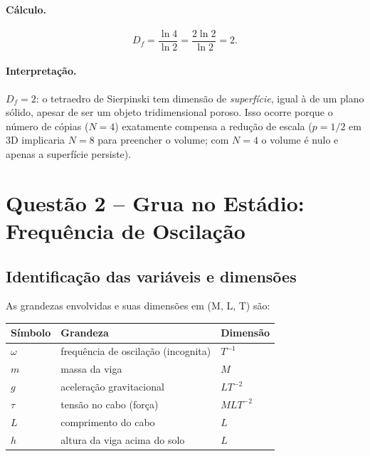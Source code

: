 \documentclass[12pt,a4paper]{article}
\theoremstyle{definition}
\newcommand{\resultado}[1]{%
  \begin{center}
    \fbox{\parbox{0.85\linewidth}{\centering $\displaystyle #1$}}
  \end{center}
}
\begin{document}
\paragraph{C\'alculo.}
\begin{equation}
  D_f = \frac{\ln 4}{\ln 2}
      = \frac{2\ln 2}{\ln 2} = 2.
\end{equation}
\resultado{D_f = 2}

\paragraph{Interpreta\c{c}\~ao.}
$D_f = 2$: o tetraedro de Sierpinski tem dimens\~ao de \emph{superf\'icie},
igual \`a de um plano s\'olido, apesar de ser um objeto tridimensional poroso.
Isso ocorre porque o n\'umero de c\'opias ($N=4$) exatamente compensa a redu\c{c}\~ao
de escala ($p = 1/2$ em 3D implicaria $N = 8$ para preencher o volume;
com $N=4$ o volume \'e nulo e apenas a superf\'icie persiste).

\section{Quest\~ao 2 -- Grua no Est\'adio: Frequ\^encia de Oscila\c{c}\~ao}

\subsection{Identifica\c{c}\~ao das vari\'aveis e dimens\~oes}

As grandezas envolvidas e suas dimens\~oes em (M, L, T) s\~ao:

\begin{center}
\begin{tabular}{lll}
\toprule
\textbf{S\'imbolo} & \textbf{Grandeza} & \textbf{Dimens\~ao}\\
\midrule
$\omega$   & frequ\^encia de oscila\c{c}\~ao (incognita) & $T^{-1}$ \\
$m$        & massa da viga                                 & $M$ \\
$g$        & acelera\c{c}\~ao gravitacional                & $LT^{-2}$ \\
$\tau$     & tens\~ao no cabo (for\c{c}a)                  & $MLT^{-2}$ \\
$L$        & comprimento do cabo                           & $L$ \\
$h$        & altura da viga acima do solo                  & $L$ \\
\bottomrule
\end{tabular}
\end{center}
\end{document}
